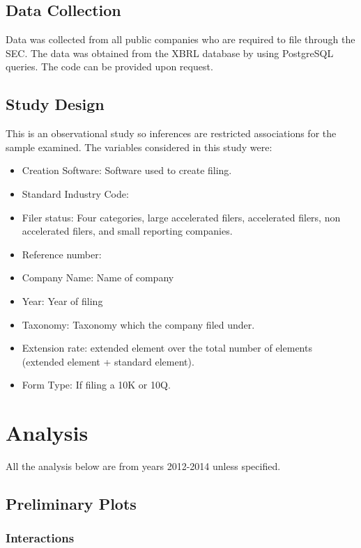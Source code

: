 \documentclass{article}
\begin{document}
\subsection{Data Collection}
Data was collected from all public companies who are required to file through the SEC. The data was obtained from the XBRL database by using PostgreSQL queries. The code can be provided upon request. 
\subsection{Study Design}
This is an observational study so inferences are restricted associations for the sample examined. The variables considered in this study were:\\
\begin{itemize}
\item Creation Software: Software used to create filing.
\item Standard Industry Code:
\item Filer status: Four categories, large accelerated filers, accelerated filers, non accelerated filers, and small reporting companies.
\item Reference number:
\item Company Name: Name of company
\item Year: Year of filing 
\item Taxonomy: Taxonomy which the company filed under. 
\item Extension rate: extended element over the total number of elements (extended element + standard element). 
\item Form Type: If filing a 10K or 10Q.

\end{itemize}
\section{Analysis}
\noindent All the analysis below are from years 2012-2014 unless specified. \\

\subsection{Preliminary Plots}



\pagebreak

\subsubsection{Interactions}
\end{document}

